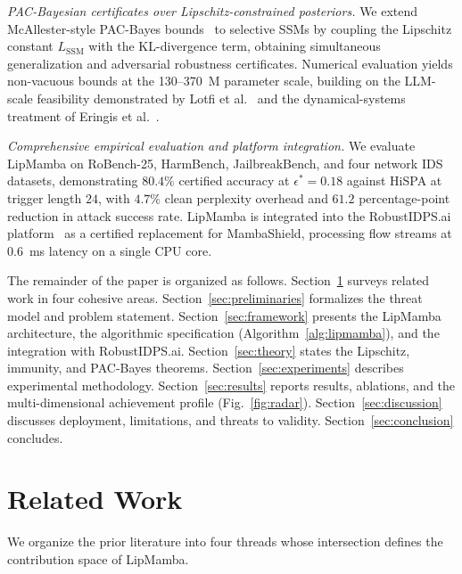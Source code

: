 \documentclass[journal,a4paper,10pt]{IEEEtran}
\theoremstyle{definition}
\theoremstyle{remark}
\newcommand{\modelname}{LipMamba}
\begin{document}
\textit{PAC-Bayesian certificates over Lipschitz-constrained posteriors.} We extend McAllester-style PAC-Bayes bounds~\cite{mcallester2003pac,perezortiz2021tighter} to selective SSMs by coupling the Lipschitz constant $L_{\mathrm{SSM}}$ with the KL-divergence term, obtaining simultaneous generalization and adversarial robustness certificates. Numerical evaluation yields non-vacuous bounds at the 130--370~M parameter scale, building on the LLM-scale feasibility demonstrated by Lotfi et al.~\cite{lotfi2024nonvacuous} and the dynamical-systems treatment of Eringis et al.~\cite{eringis2024pacbayes}.

\textit{Comprehensive empirical evaluation and platform integration.} We evaluate \modelname{} on RoBench-25, HarmBench, JailbreakBench, and four network IDS datasets, demonstrating $80.4\%$ certified accuracy at $\epsilon^* = 0.18$ against HiSPA at trigger length $24$, with $4.7\%$ clean perplexity overhead and $61.2$ percentage-point reduction in attack success rate. \modelname{} is integrated into the RobustIDPS.ai platform~\cite{anaedevha2026robustidps} as a certified replacement for MambaShield, processing flow streams at $0.6$~ms latency on a single CPU core.

The remainder of the paper is organized as follows. Section~\ref{sec:related} surveys related work in four cohesive areas. Section~\ref{sec:preliminaries} formalizes the threat model and problem statement. Section~\ref{sec:framework} presents the \modelname{} architecture, the algorithmic specification (Algorithm~\ref{alg:lipmamba}), and the integration with RobustIDPS.ai. Section~\ref{sec:theory} states the Lipschitz, immunity, and PAC-Bayes theorems. Section~\ref{sec:experiments} describes experimental methodology. Section~\ref{sec:results} reports results, ablations, and the multi-dimensional achievement profile (Fig.~\ref{fig:radar}). Section~\ref{sec:discussion} discusses deployment, limitations, and threats to validity. Section~\ref{sec:conclusion} concludes.


\section{Related Work}
\label{sec:related}

We organize the prior literature into four threads whose intersection defines the contribution space of \modelname{}.
\end{document}
